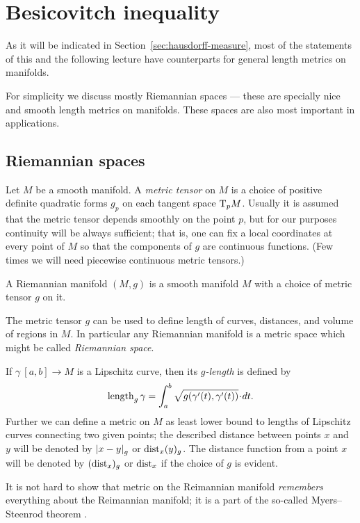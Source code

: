 \chapter{Besicovitch inequality} 

As it will be indicated in Section~\ref{sec:hausdorff-measure},
most of the statements of this and the following lecture have counterparts for general length metrics on manifolds.

For simplicity we discuss mostly Riemannian spaces --- these are specially nice and smooth length metrics on manifolds.
These spaces are also most important in applications.

\section{Riemannian spaces}

Let $M$ be a smooth manifold.
A \emph{metric tensor} on $M$ is a choice of positive definite quadratic forms $g_p$ on each tangent space $\mathrm{T}_pM$.
Usually it is assumed that the metric tensor depends smoothly on the point $p$,
but for our purposes continuity will be always sufficient;
that is, one can fix a local coordinates at every point of $M$ so that the components of $g$ are continuous functions.
(Few times we will need piecewise continuous metric tensors.)

A Riemannian manifold $(M,g)$ is a smooth manifold $M$ with a choice of metric tensor $g$ on it.

The metric tensor $g$ can be used to define length of curves, distances, and volume of regions in $M$.
In particular any Riemannian manifold is a metric space which might be called \emph{Riemannian space}.

If $\gamma\:[a,b]\to M$ is a Lipschitz curve, then its \emph{$g$-length} is defined by
\[\length_g\gamma=\int_a^b\sqrt{g(\gamma'(t),\gamma'(t))}\cdot dt.\]
Further we can define a metric on $M$ as least lower bound to lengths of Lipschitz curves connecting two given points;
the described distance between points $x$ and $y$ will be denoted by $\dist{x}{y}{g}$ or $\mathrm{dist}_x(y)_g$.
The distance function from a point $x$ will be denoted by $(\mathrm{dist}_x)_g$ or $\mathrm{dist}_x$ if the choice of $g$ is evident.

It is not hard to show that metric on the Reimannian manifold {}\emph{remembers} everything about the Reimannian manifold;
it is a part of the so-called Myers--Steenrod theorem \cite{myers-steenrod}.

